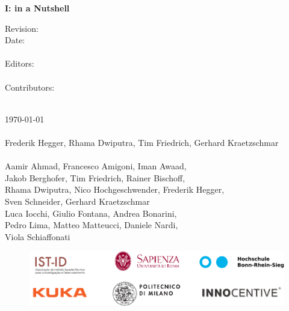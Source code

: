 \noindent\textbf{%
	{\Large I: \erlirlong in a Nutshell}\\[1ex]
}

\vfill
\noindent
\begin{minipage}[t]{0.18\textwidth}
\flushleft
	Revision:\\
	Date:\\
	\mbox{~}\\
	Editors:\\
	\mbox{~}\\
	Contributors:\\
\end{minipage}%
\hspace*{3mm}
\begin{minipage}[t]{0.8\textwidth}
\flushleft
	\revisionNumberNutshell\\
	\today\\
	\mbox{~}\\
	Frederik Hegger, Rhama Dwiputra, Tim Friedrich, Gerhard Kraetzschmar\\
	\mbox{~}\\
	Aamir Ahmad, Francesco Amigoni, Iman Awaad,\\ 
	Jakob Berghofer, Tim Friedrich, Rainer Bischoff,\\
	Rhama Dwiputra, Nico Hochgeschwender, Frederik Hegger,\\
	Sven Schneider, Gerhard Kraetzschmar \\
	Luca Iocchi, Giulio Fontana, Andrea Bonarini,\\
	Pedro Lima,	Matteo Matteucci, Daniele Nardi, \\
	Viola Schiaffonati
\end{minipage}
\hfill

\vfill
\vspace*{-10mm}
\begin{figure}[b]
	\centering
	\includegraphics[height=\institutionLogoHeight]{./fig/logos/consortiumLogo.pdf}
\end{figure}

